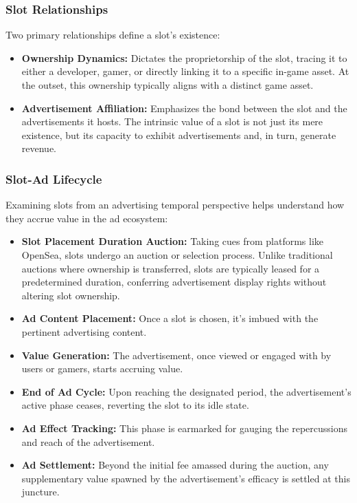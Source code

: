 \subsubsection{Slot Relationships}
Two primary relationships define a slot's existence:
\begin{itemize}
    \item \textbf{Ownership Dynamics:} Dictates the proprietorship of the slot, tracing it to either a developer, gamer, or directly linking it to a specific in-game asset. At the outset, this ownership typically aligns with a distinct game asset.
    \item \textbf{Advertisement Affiliation:} Emphasizes the bond between the slot and the advertisements it hosts. The intrinsic value of a slot is not just its mere existence, but its capacity to exhibit advertisements and, in turn, generate revenue.
\end{itemize}

\subsubsection{Slot-Ad Lifecycle}

Examining slots from an advertising temporal perspective helps understand how they accrue value in the ad ecosystem:

\begin{itemize}
    \item \textbf{Slot Placement Duration Auction:} Taking cues from platforms like OpenSea, slots undergo an auction or selection process. Unlike traditional auctions where ownership is transferred, slots are typically leased for a predetermined duration, conferring advertisement display rights without altering slot ownership.
    
    \item \textbf{Ad Content Placement:} Once a slot is chosen, it's imbued with the pertinent advertising content.
    
    \item \textbf{Value Generation:} The advertisement, once viewed or engaged with by users or gamers, starts accruing value.
    
    \item \textbf{End of Ad Cycle:} Upon reaching the designated period, the advertisement's active phase ceases, reverting the slot to its idle state.
    
    \item \textbf{Ad Effect Tracking:} This phase is earmarked for gauging the repercussions and reach of the advertisement.
    
    \item \textbf{Ad Settlement:} Beyond the initial fee amassed during the auction, any supplementary value spawned by the advertisement's efficacy is settled at this juncture.
\end{itemize}

